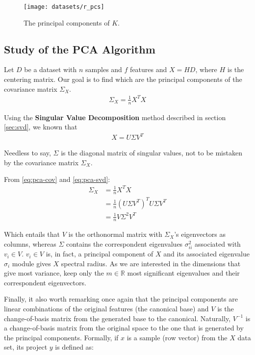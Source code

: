 \begin{figure}[H]
	\centering
	\captionsetup{justification=centering}
	\texttt{[image: datasets/r\_pcs]}
	\caption{The principal components of $K$.}
	\label{fig:datasetrpc}
\end{figure}

\subsection{Study of the PCA Algorithm}

Let $D$ be a dataset with $n$ samples and $f$ features and $X=HD$, where $H$ is the centering matrix. Our goal is to find which are the principal components of the covariance matrix $\Sigma_X$.
\begin{align}
	\label{eq:pca-cov}
	\Sigma_X=\frac{1}{n} X^TX
\end{align}

Using the \textbf{Singular Value Decomposition} method described in section \ref{sec:svd}, we known that
\begin{align}
	\label{eq:pca-svd}
	X = U\Sigma V^T
\end{align}

Needless to say, $\Sigma$ is the diagonal matrix of singular values, not to be mistaken by the covariance matrix $\Sigma_X$.

From \ref{eq:pca-cov} and \ref{eq:pca-svd}:
\begin{align*}
	\Sigma_X &= \frac{1}{n} X^TX \\
	&= \frac{1}{n} (U\Sigma V^T)^TU\Sigma V^T \\
	&= \frac{1}{n} V\Sigma^2 V^T
\end{align*}

Which entails that $V$ is the orthonormal matrix with $\Sigma_X$'s eigenvectors as columns, whereas $\Sigma$ contains the correspondent eigenvalues $\sigma_{ii}^2$ associated with $v_i\in V$. $v_i\in V$ is, in fact, a principal component of $X$ and its associated eigenvalue $\sigma_i$ module gives $X$ spectral radius. As we are interested in the dimensions that give most variance, keep only the $m\in\mathbb{R}$ most significant eigenvalues and their correspondent eigenvectors.

Finally, it also worth remarking once again that the principal components are linear combinations of the original features (the canonical base) and $V$ is the change-of-basis matrix from the generated base to the canonical. Naturally, $V^{-1}$ is a change-of-basis matrix from the original space to the one that is generated by the principal components. Formally, if $x$ is a sample (row vector) from the $X$ data set, its project $y$ is defined as:

